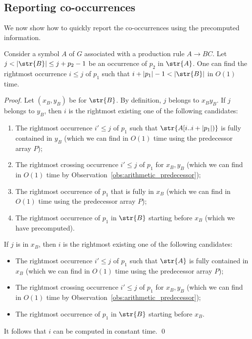 \subsection{Reporting co-occurrences}
We now show how to quickly report the co-occurrences using the precomputed information. 

\begin{proposition}\label{claim:predecessor_of_crossing}
Consider a symbol $A$ of $G$ associated with a production rule $A \rightarrow BC$. Let $j < |\str{B}| \le j+p_2-1$ be an occurrence of $p_2$ in $\str{A}$. One can find the rightmost occurrence $i \le j$ of $p_1$ such that $i+|p_1|-1 < |\str{B}|$ in $O(1)$ time.  
\end{proposition}
\begin{proof}
Let $(x_B, y_B)$ be  for $\str{B}$. By definition, $j$ belongs to $x_By_B$. If $j$ belongs to $y_B$, then $i$ is the rightmost existing one of the following candidates:
\begin{enumerate}
    \item The rightmost occurrence $i' \le j$ of $p_1$ such that $\str{A[i..i+|p_1|)}$ is fully contained in $y_B$ (which we can find in $O(1)$ time using the predecessor array $P$); 
    \item The rightmost crossing occurrence $i' \le j$ of $p_1$ for $x_B, y_B$ (which we can find in $O(1)$ time by Observation~\ref{obs:arithmetic_predecessor});
    \item The rightmost occurrence of $p_1$ that is fully in $x_B$ (which we can find in $O(1)$ time using the predecessor array $P$); 
    \item The rightmost occurrence of $p_1$ in $\str{B}$ starting before $x_B$ (which we have precomputed). 
\end{enumerate}
If $j$ is in $x_B$, then $i$ is the rightmost existing one of the following candidates:
     \begin{itemize}
         \item The rightmost occurrence $i' \le j$ of $p_1$ such that $\str{A}$ is fully contained in $x_B$ (which we can find in $O(1)$ time using the predecessor array $P$);
         \item The rightmost crossing occurrence $i' \le j$ of $p_1$ for $x_B, y_B$ (which we can find in $O(1)$ time by Observation~\ref{obs:arithmetic_predecessor});
         \item The rightmost occurrence of $p_1$ in $\str{B}$ starting before $x_B$. 
     \end{itemize}
It follows that $i$ can be computed in constant time.
\qed 
\end{proof}

